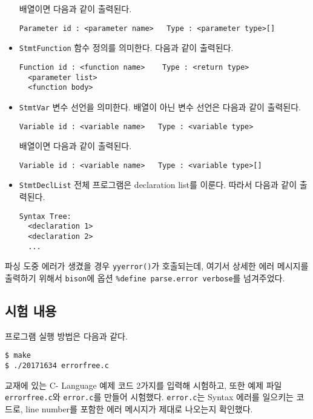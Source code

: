 \documentclass[a4paper, 10pt]{oblivoir}
\begin{document}
\begin{itemize}
배열이면 다음과 같이 출력된다.
\begin{lstlisting}[frame=single]
Parameter id : <parameter name>   Type : <parameter type>[]
\end{lstlisting}

\item \texttt{StmtFunction} \newline
함수 정의를 의미한다. 다음과 같이 출력된다.
\begin{lstlisting}[frame=single]
Function id : <function name>    Type : <return type>
  <parameter list>
  <function body>
\end{lstlisting}

\item \texttt{StmtVar} \newline
변수 선언을 의미한다. 배열이 아닌 변수 선언은 다음과 같이 출력된다.
\begin{lstlisting}[frame=single]
Variable id : <variable name>   Type : <variable type>
\end{lstlisting}

배열이면 다음과 같이 출력된다.
\begin{lstlisting}[frame=single]
Variable id : <variable name>   Type : <variable type>[]
\end{lstlisting}

\item \texttt{StmtDeclList} \newline
전체 프로그램은 declaration list를 이룬다. 따라서 다음과 같이 출력된다.
\begin{lstlisting}[frame=single]
Syntax Tree:
  <declaration 1>
  <declaration 2>
  ...
\end{lstlisting}

\end{itemize}

파싱 도중 에러가 생겼을 경우 \texttt{yyerror()}가 호출되는데, 여기서 상세한 에러 메시지를 출력하기 위해서 \texttt{bison}에 옵션 \texttt{\%define parse.error verbose}를 넘겨주었다.

\subsection{시험 내용}
프로그램 실행 방법은 다음과 같다.
\begin{lstlisting}[frame=single]
$ make
$ ./20171634 errorfree.c
\end{lstlisting}

교재에 있는 C- Language 예제 코드 2가지를 입력해 시험하고, 또한 예제 파일 \texttt{errorfree.c}와 \texttt{error.c}를 만들어 시험했다. \texttt{error.c}는 Syntax 에러를 일으키는 코드로, line number를 포함한 에러 메시지가 제대로 나오는지 확인했다. 
\end{document}
